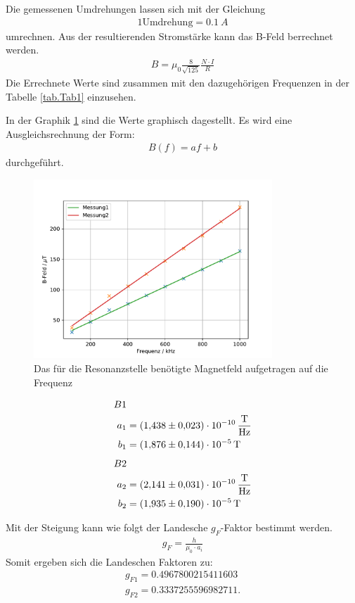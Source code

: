 Die gemessenen Umdrehungen lassen sich mit der Gleichung
\begin{align*}
  1 \text{Umdrehung} = \SI{0,1}{A}
\end{align*}
umrechnen. Aus der resultierenden Stromstärke kann das B-Feld berrechnet werden.
\begin{align*}
  B=\mu_0\frac{8}{\sqrt{125}}\frac{N\cdot I}{R}
\end{align*}
Die Errechnete Werte sind zusammen mit den dazugehörigen Frequenzen in der Tabelle \ref{tab.Tab1} einzusehen.

\FloatBarrier
In der Graphik \ref{fig:Bf} sind die Werte graphisch dagestellt.
Es wird eine Ausgleichsrechnung der Form:
\begin{align*}
  B(f)=af+b
\end{align*}
durchgeführt.
\begin{figure}[h!]
  \centering
  \includegraphics[width=0.8\textwidth]{B-Feld.pdf}
  \caption{Das für die Resonanzstelle benötigte Magnetfeld aufgetragen auf die Frequenz}
  \label{fig:Bf}
\end{figure}
\begin{align*}
  B1&\\
  a_1&=\SI{1.438\pm 0.023e-10}{\frac{T}{Hz}}\\
  b_1&=\SI{1.876\pm 0.144e-5}{T}
\end{align*}
\begin{align*}
  B2&\\
  a_2&=\SI{2.141\pm0.031e-10}{\frac{T}{Hz}}\\
  b_2&=\SI{1.935\pm0.190e-5}{T}
\end{align*}

Mit der Steigung kann wie folgt der Landesche $g_F$-Faktor bestimmt werden.
\begin{align*}
  g_F = \frac{h}{\mu_0\cdot a_i}
\end{align*}
Somit ergeben sich die Landeschen Faktoren zu:
\begin{align*}
  g_{F1} = 0.4967800215411603\\
  g_{F2} = 0.3337255596982711.
\end{align*}

